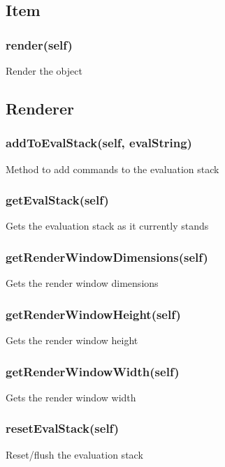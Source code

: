\subsection{Item}

\subsubsection{render(self)}

Render the object

\subsection{Renderer}

\subsubsection{addToEvalStack(self, evalString)}

Method to add commands to the evaluation stack

\subsubsection{getEvalStack(self)}

Gets the evaluation stack as it currently stands

\subsubsection{getRenderWindowDimensions(self)}

Gets the render window dimensions

\subsubsection{getRenderWindowHeight(self)}

Gets the render window height

\subsubsection{getRenderWindowWidth(self)}

Gets the render window width

\subsubsection{resetEvalStack(self)}

Reset/flush the evaluation stack

